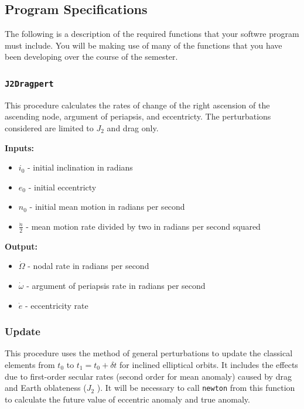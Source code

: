 \documentclass[11pt, reqno]{article}    %
\begin{document}
\subsection*{Program Specifications}
The following is a description of the required functions that your softwre program must include.
You will be making use of many of the functions that you have been developing over the course of the semester.

\subsubsection*{\texttt{J2Dragpert}}

This procedure calculates the rates of change of the right ascension of the ascending node, argument of periapsis, and eccentricty.
The perturbations considered are limited to \( J_2 \) and drag only.

\noindent \textbf{Inputs: }
\begin{itemize}
    \item \( i_0 \) - initial inclination in radians
    \item \( e_0 \) - initial eccentricty
    \item \( n_0 \) - initial mean motion in radians per second
    \item \( \frac{\dot{n}}{2} \) - mean motion rate divided by two in radians per second squared
\end{itemize}

\noindent\textbf{Output: }
\begin{itemize}
    \item \( \dot{\Omega} \) - nodal rate in radians per second
    \item \( \dot{\omega} \) - argument of periapsis rate in radians per second
    \item \( \dot{e} \) - eccentricity rate
\end{itemize}

\subsubsection*{Update}
This procedure uses the method of general perturbations to update the classical elements from \( t_0 \) to \( t_1 = t_0 + \delta t \) for inclined elliptical orbits.
It includes the effects due to first-order secular rates (second order for mean anomaly) caused by drag and Earth oblateness (\( J_2 \) ). 
It will be necessary to call \texttt{newton} from this function to calculate the future value of eccentric anomaly and true anomaly.
\end{document}
